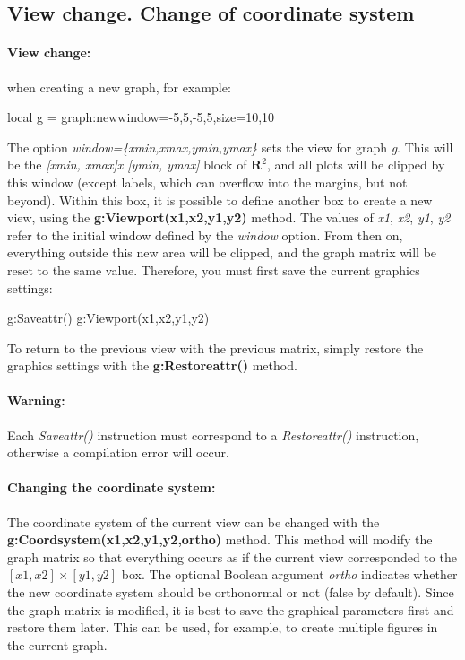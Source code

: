 \subsection{View change. Change of coordinate system}

\paragraph{View change: } when creating a new graph, for example:
\begin{Luacode}
local g = graph:new{window={-5,5,-5,5},size={10,10}}
\end{Luacode}
The option \emph{window=\{xmin,xmax,ymin,ymax\}} sets the view for graph \emph{g}. This will be the \emph{[xmin, xmax]x [ymin, ymax]} block of $\mathbf R^2$, and all plots will be clipped by this window (except labels, which can overflow into the margins, but not beyond). Within this box, it is possible to define another box to create a new view, using the \textbf{g:Viewport(x1,x2,y1,y2)} method. The values ​​of \emph{x1}, \emph{x2}, \emph{y1}, \emph{y2} refer to the initial window defined by the \emph{window} option. From then on, everything outside this new area will be clipped, and the graph matrix will be reset to the same value. Therefore, you must first save the current graphics settings:
\begin{Luacode}
g:Saveattr()
g:Viewport(x1,x2,y1,y2)
\end{Luacode}
To return to the previous view with the previous matrix, simply restore the graphics settings with the \textbf{g:Restoreattr()} method.

\paragraph{Warning: } Each \emph{Saveattr()} instruction must correspond to a \emph{Restoreattr()} instruction, otherwise a compilation error will occur.

\paragraph{Changing the coordinate system: } The coordinate system of the current view can be changed with the \textbf{g:Coordsystem(x1,x2,y1,y2,ortho)} method. This method will modify the graph matrix so that everything occurs as if the current view corresponded to the $[x1,x2]\times[y1,y2]$ box. The optional Boolean argument \emph{ortho} indicates whether the new coordinate system should be orthonormal or not (false by default). Since the graph matrix is ​​modified, it is best to save the graphical parameters first and restore them later. This can be used, for example, to create multiple figures in the current graph.

